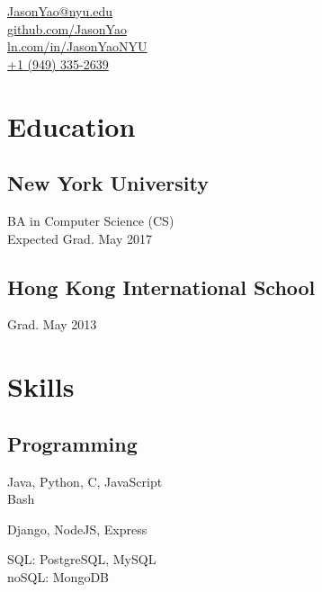 \documentclass[]{hieudo-build}
\begin{document}
{
	\faEnvelope \hspace{0.1cm} \href{mailto:JasonYao@nyu.edu}{JasonYao@nyu.edu}\\
	\faGithub \hspace{0.1cm} \href{https://github.com/JasonYao}{github.com/JasonYao}\\
	\faLinkedinSquare \hspace{0.1cm} \href{https://www.linkedin.com/in/JasonYaoNYU/}{ln.com/in/JasonYaoNYU}\\
    \faPhone \hspace{0.1cm} \href{tel:19493352639}{+1 (949) 335-2639}
}

\begin{minipage}[t]{0.34\textwidth} 

\section{Education} 

\subsection{New York University}
BA in Computer Science (CS) \\
Expected Grad. May 2017 \\
\sectionsep

\subsection{Hong Kong International School}
Grad. May 2013 \\
\sectionsep

\section{Skills}
\subsection{Programming}
Java, Python, C, JavaScript\\
Bash
\newline

Django, NodeJS, Express
\newline

SQL: PostgreSQL, MySQL\\
noSQL: MongoDB
\newline


\end{minipage}
\end{document}
